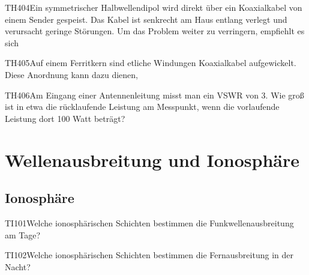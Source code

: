 \begin{question}{TH404}{Ein symmetrischer Halbwellendipol wird direkt über ein Koaxialkabel von einem Sender gespeist. Das Kabel ist senkrecht am Haus entlang verlegt und verursacht geringe Störungen. Um das Problem weiter zu verringern, empfiehlt es sich}
\end{question}

\begin{question}{TH405}{Auf einem Ferritkern sind etliche Windungen Koaxialkabel aufgewickelt. Diese Anordnung kann dazu dienen,}
\end{question}

\begin{question}{TH406}{Am Eingang einer Antennenleitung misst man ein VSWR von 3. Wie groß ist in etwa die rücklaufende Leistung am Messpunkt, wenn die vorlaufende Leistung dort 100 Watt beträgt?}
\end{question}

\section{Wellenausbreitung und Ionosphäre}

\subsection{Ionosphäre}

\begin{question}{TI101}{Welche ionosphärischen Schichten bestimmen die Funkwellenausbreitung am Tage?}
\end{question}

\begin{question}{TI102}{Welche ionosphärischen Schichten bestimmen die Fernausbreitung in der Nacht?}
\end{question}

